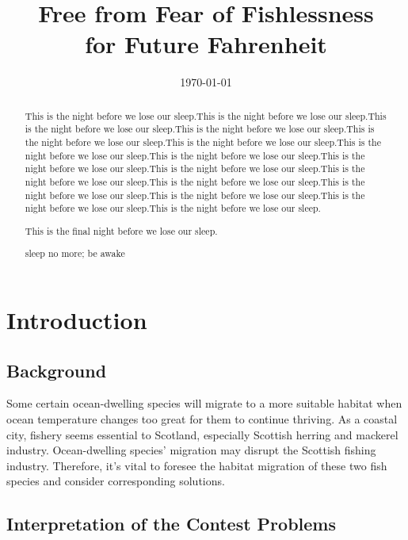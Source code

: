 \documentclass{mcmthesis}
\title{Free from Fear of Fishlessness \\for Future Fahrenheit}
\date{\today}
\begin{document}
\begin{abstract}
This is the night before we lose our sleep.This is the night before we lose our sleep.This is the night before we lose our sleep.This is the night before we lose our sleep.This is the night before we lose our sleep.This is the night before we lose our sleep.This is the night before we lose our sleep.This is the night before we lose our sleep.This is the night before we lose our sleep.This is the night before we lose our sleep.This is the night before we lose our sleep.This is the night before we lose our sleep.This is the night before we lose our sleep.This is the night before we lose our sleep.This is the night before we lose our sleep.This is the night before we lose our sleep.

This is the final night before we lose our sleep.
\begin{keywords}
sleep no more; be awake
\end{keywords}
\end{abstract}

\maketitle
 \tableofcontents
 \newpage


\section{Introduction}
\subsection{Background}
Some certain ocean-dwelling species will migrate to a more suitable habitat when ocean temperature changes too great for them to continue thriving.
As a coastal city, fishery seems essential to Scotland, especially Scottish herring and mackerel industry. Ocean-dwelling species' migration may disrupt the Scottish fishing industry.
Therefore, it's vital to foresee the habitat migration of these two fish species and consider corresponding solutions.

\subsection{Interpretation of the Contest Problems}
\end{document}
